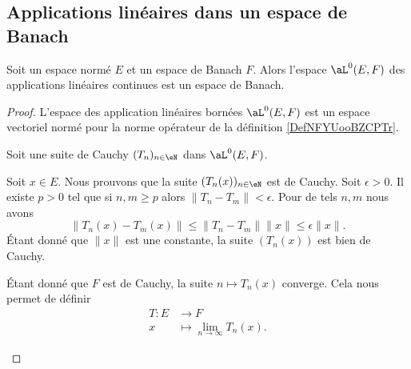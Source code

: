 \subsection{Applications linéaires dans un espace de Banach}



\begin{proposition}	\label{PROPooUZEHooRiEnOG}
	Soit un espace normé \( E\) et un espace de Banach \( F\). Alors l'espace \( \aL^0(E,F)\) des applications linéaires continues est un espace de Banach.
\end{proposition}

\begin{proof}
	L'espace des application linéaires bornées \( \aL^0(E,F)\) est un espace vectoriel normé pour la norme opérateur de la définition \ref{DefNFYUooBZCPTr}.

	Soit une suite de Cauchy \( (T_n)_{n\in \eN}\) dans \( \aL^0(E,F)\).
	\begin{subproof}
		Soit \( x\in E\). Nous prouvons que la suite \( (T_n(x))_{n\in \eN}\) est de Cauchy. Soit \( \epsilon>0\). Il existe \( p>0\) tel que si \( n,m\geq p\) alors \( \| T_n-T_m \|<\epsilon\). Pour de tels \( n,m\) nous avons
		\begin{equation}
			\| T_n(x)-T_m(x) \|\leq \| T_n-T_m \|\| x \|\leq \epsilon\| x \|.
		\end{equation}
		Étant donné que \( \| x \|\) est une constante, la suite \( (T_n(x))\) est bien de Cauchy.

		\spitem[L'application \( T\)]
		Étant donné que \( F\) est de Cauchy, la suite \( n\mapsto T_n(x)\) converge. Cela nous permet de définir
		\begin{equation}
			\begin{aligned}
				T\colon E & \to F                             \\
				x         & \mapsto \lim_{n\to \infty}T_n(x).
			\end{aligned}
		\end{equation}


\end{subproof}
\end{proof}
